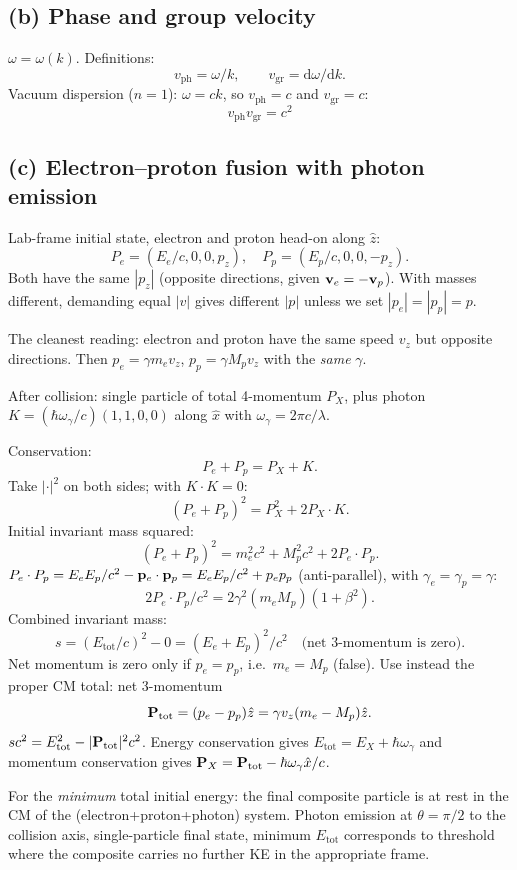 \documentclass[11pt]{article}
\newcommand{\de}{\mathrm{d}}
\begin{document}
\subsection*{(b) Phase and group velocity}

$\omega = \omega(k)$. Definitions:
\[ v_\text{ph} = \omega/k, \qquad v_\text{gr} = \de\omega/\de k. \]
Vacuum dispersion ($n=1$): $\omega = c k$, so $v_\text{ph} = c$ and $v_\text{gr} = c$:
\[ \boxed{\;v_\text{ph} v_\text{gr} = c^2\;} \]

\subsection*{(c) Electron--proton fusion with photon emission}

Lab-frame initial state, electron and proton head-on along $\hat z$:
\[ P_e = (E_e/c,0,0,p_z), \quad P_p = (E_p/c,0,0,-p_z). \]
Both have the same $|p_z|$ (opposite directions, given $\vb v_e = -\vb v_p$). With masses different, demanding equal $|v|$ gives different $|p|$ unless we set $|p_e|=|p_p|=p$.

The cleanest reading: electron and proton have the same speed $v_z$ but opposite directions. Then $p_e = \gamma m_e v_z$, $p_p = \gamma M_p v_z$ with the \emph{same} $\gamma$.

After collision: single particle of total 4-momentum $P_X$, plus photon $K = (\hbar\omega_\gamma/c)(1,1,0,0)$ along $\hat x$ with $\omega_\gamma = 2\pi c/\lambda$.

Conservation:
\[ P_e + P_p = P_X + K. \]
Take $|\cdot|^2$ on both sides; with $K\cdot K = 0$:
\[ (P_e+P_p)^2 = P_X^2 + 2 P_X\cdot K. \]
Initial invariant mass squared:
\[ (P_e+P_p)^2 = m_e^2 c^2 + M_p^2 c^2 + 2 P_e\cdot P_p. \]
$P_e\cdot P_p = E_e E_p/c^2 - \vb p_e\cdot\vb p_p = E_e E_p/c^2 + p_e p_p$ (anti-parallel), with $\gamma_e = \gamma_p = \gamma$:
\[ 2P_e\cdot P_p/c^2 = 2\gamma^2(m_e M_p)(1 + \beta^2). \]
Combined invariant mass:
\[ s = (E_\text{tot}/c)^2 - 0 = (E_e+E_p)^2/c^2 \quad\text{(net 3-momentum is zero)}. \]
Net momentum is zero only if $p_e = p_p$, i.e.\ $m_e = M_p$ (false). Use instead the proper CM total: net 3-momentum
\[ \vb P_\text{tot} = (p_e - p_p)\hat z = \gamma v_z(m_e - M_p)\hat z. \]
$s c^2 = E_\text{tot}^2 - |\vb P_\text{tot}|^2 c^2$. Energy conservation gives $E_\text{tot} = E_X + \hbar\omega_\gamma$ and momentum conservation gives $\vb P_X = \vb P_\text{tot} - \hbar\omega_\gamma\hat x/c$.

For the \emph{minimum} total initial energy: the final composite particle is at rest in the CM of the (electron+proton+photon) system. Photon emission at $\theta=\pi/2$ to the collision axis, single-particle final state, minimum $E_\text{tot}$ corresponds to threshold where the composite carries no further KE in the appropriate frame.
\end{document}
